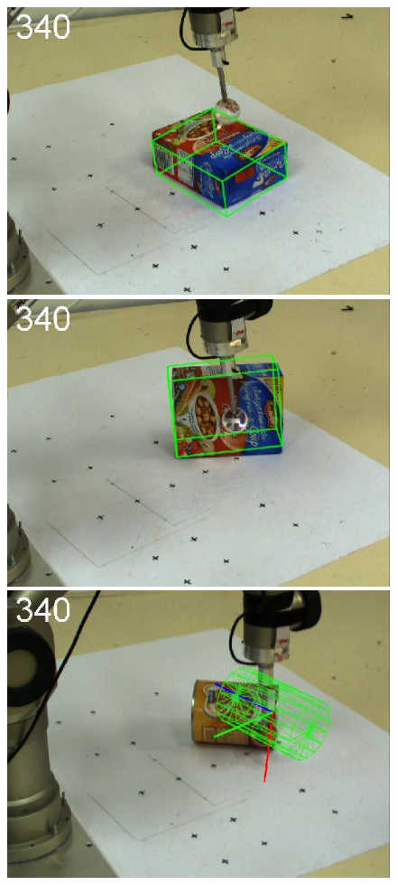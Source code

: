 \begin{figure}[htbp]
{\includegraphics[width=\imgAXwid]{images/A2_LWPR1_399_5}
\includegraphics[width=\imgAXwid]{images/A2_2exp_87_5}
\includegraphics[width=\imgAXwid]{images/A3_2exp_39_5}
}
\end{figure}
